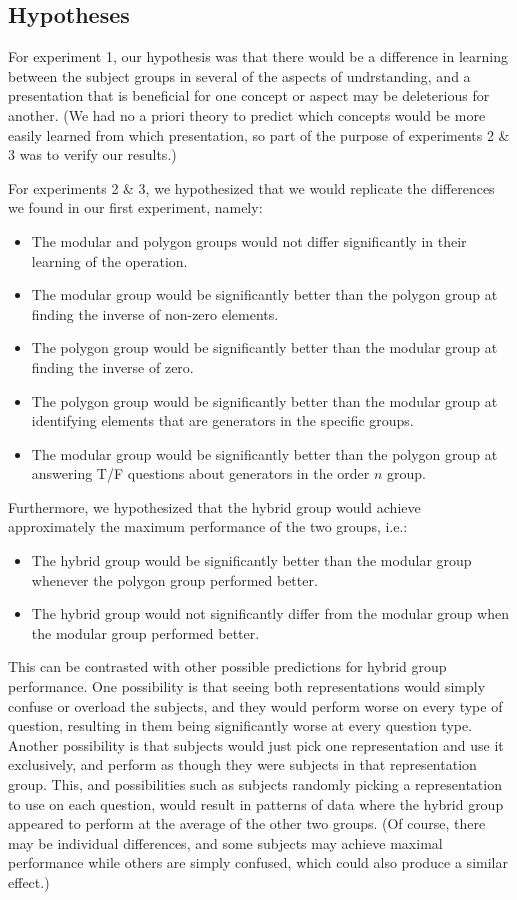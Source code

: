 \documentclass[man,10pt]{apa6}
\begin{document}
\subsection{Hypotheses}
For experiment 1, our hypothesis was that there would be a difference in learning between the subject groups in several of the aspects of undrstanding, and a presentation that is beneficial for one concept or aspect may be deleterious for another. (We had no a priori theory to predict which concepts would be more easily learned from which presentation, so part of the purpose of experiments 2 \& 3 was to verify our results.)\par
For experiments 2 \& 3, we hypothesized that we would replicate the differences we found in our first experiment, namely: 
\begin{itemize} 
\item The modular and polygon groups would not differ significantly in their learning of the operation.
\item The modular group would be significantly better than the polygon group at finding the inverse of non-zero elements.
\item The polygon group would be significantly better than the modular group at finding the inverse of zero.
\item The polygon group would be significantly better than the modular group at identifying elements that are generators in the specific groups.
\item The modular group would be significantly better than the polygon group at answering T/F questions about generators in the order $n$ group.
\end{itemize}
Furthermore, we hypothesized that the hybrid group would achieve approximately the maximum performance of the two groups, i.e.:
\begin{itemize}
\item The hybrid group would be significantly better than the modular group whenever the polygon group performed better.
\item The hybrid group would not significantly differ from the modular group when the modular group performed better.
\end{itemize}
This can be contrasted with other possible predictions for hybrid group performance. One possibility is that seeing both representations would simply confuse or overload the subjects, and they would perform worse on every type of question, resulting in them being significantly worse at every question type. Another possibility is that subjects would just pick one representation and use it exclusively, and perform as though they were subjects in that representation group. This, and possibilities such as subjects randomly picking a representation to use on each question, would result in patterns of data where the hybrid group appeared to perform at the average of the other two groups. (Of course, there may be individual differences, and some subjects may achieve maximal performance while others are simply confused, which could also produce a similar effect.) \par
\end{document}
